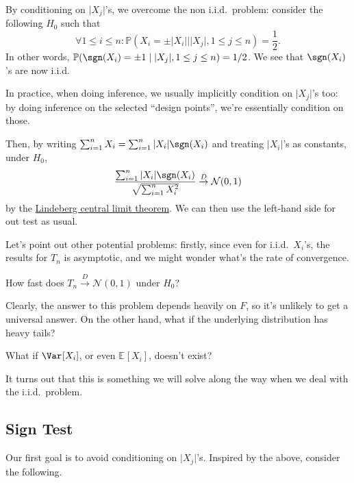 By conditioning on \(\lvert X_j \rvert \)'s, we overcome the non i.i.d.\ problem: consider the following \(H_0\) such that
\[
	\forall 1 \leq i \leq n \colon \mathbb{P} (X_i = \pm \vert X_i \vert \mid \vert X_j \vert , 1 \leq j \leq n) = \frac{1}{2}.
\]
In other words, \(\mathbb{P} (\sgn (X_i) = \pm 1 \mid \vert X_j \vert , 1 \leq j \leq n) = 1 / 2\). We see that \(\sgn (X_i)\)'s are now i.i.d.

\begin{intuition}
	In practice, when doing inference, we usually implicitly condition on \(\vert X_j \vert \)'s too: by doing inference on the selected ``design points'', we're essentially condition on those.
\end{intuition}

Then, by writing \(\sum_{i=1}^{n} X_i = \sum_{i=1}^{n} \vert X_i \vert \sgn (X_i)\) and treating \(\vert X_i \vert \)'s as constants, under \(H_0\),
\begin{equation}\label{eq:two-sample}
	\frac{\sum_{i=1}^{n} \vert X_i \vert \sgn (X_i)}{\sqrt{\sum_{i=1}^{n} X_i^2} }
	\overset{D}{\to} \mathcal{N} (0, 1)
\end{equation}
by the \hyperref[thm:Lindeberg-CLT]{Lindeberg central limit theorem}. We can then use the left-hand side for out test as usual.

Let's point out other potential problems: firstly, since even for i.i.d.\ \(X_i\)'s, the results for \(T_n\) is asymptotic, and we might wonder what's the rate of convergence.

\begin{problem*}
	How fast does \(T_n \overset{D}{\to} \mathcal{N} (0, 1)\) under \(H_0\)?
\end{problem*}

Clearly, the answer to this problem depends heavily on \(F\), so it's unlikely to get a universal answer. On the other hand, what if the underlying distribution has heavy tails?

\begin{problem*}
	What if \(\Var_{}[X_i] \), or even \(\mathbb{E}_{}[X_i] \), doesn't exist?
\end{problem*}

It turns out that this is something we will solve along the way when we deal with the i.i.d.\ problem.

\subsection{Sign Test}
Our first goal is to avoid conditioning on \(\vert X_j \vert \)'s. Inspired by the above, consider the following.

